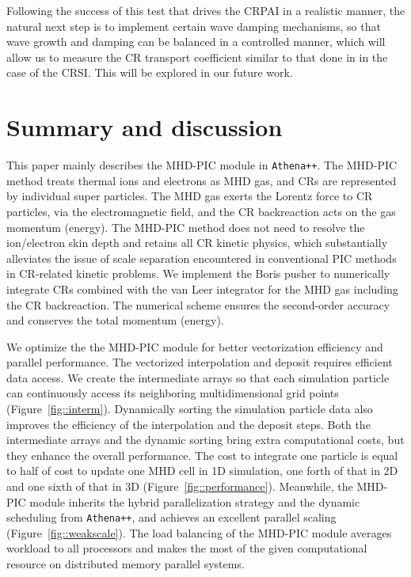 \documentclass[fleqn,usenatbib]{mnras}
\begin{document}
Following the success of this test that drives the CRPAI in a realistic manner, the natural next step is to implement certain wave damping mechanisms, so that wave growth and damping can be balanced in a controlled manner, which will allow us to measure the CR transport coefficient similar to that done in \citet{2022ApJ...928..112B} in the case of the CRSI. This will be explored in our future work.


\section{Summary and discussion}

This paper mainly describes the MHD-PIC module in \texttt{Athena++}. The  MHD-PIC method treats thermal ions and electrons as MHD gas, and CRs are represented by individual super particles. The MHD gas exerts the Lorentz force to CR particles, via the electromagnetic field, and the CR backreaction acts on the gas momentum (energy). The MHD-PIC method does not need to resolve the ion/electron skin depth and retains all CR kinetic physics, which substantially alleviates the issue of scale separation encountered in conventional PIC methods in CR-related kinetic problems. We implement the Boris pusher to numerically integrate CRs 
combined with the van Leer integrator for the MHD gas including the CR backreaction. The numerical scheme ensures the second-order accuracy and conserves the total momentum (energy).

We optimize the the MHD-PIC module for better vectorization efficiency and parallel performance. The vectorized interpolation and deposit requires efficient data access. We create the intermediate arrays so that each simulation particle can continuously access its neighboring multidimensional grid points (Figure~\ref{fig::interm}).  Dynamically sorting the simulation particle data also improves the efficiency of the interpolation and the deposit steps. Both the intermediate arrays and the dynamic sorting bring extra computational costs, but they enhance the overall performance. The cost to integrate one particle is equal to half of cost to update one MHD cell in 1D simulation, one forth of that in 2D and one sixth of that in 3D (Figure~\ref{fig::performance}). Meanwhile, the MHD-PIC module inherits the hybrid parallelization strategy and the dynamic scheduling from \texttt{Athena++}, and achieves an excellent parallel scaling (Figure~\ref{fig::weakscale}). The load balancing of the MHD-PIC module averages workload to all processors and makes the most of the given computational resource on distributed memory parallel systems.
\end{document}
